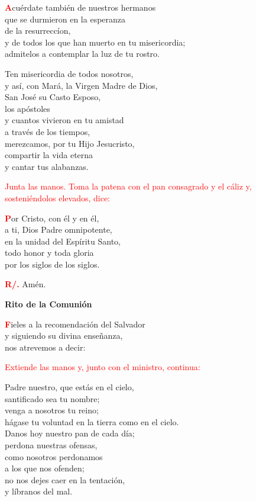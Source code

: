 \documentclass[12pt, letterpaper]{report}
\begin{document}
\lettrine[lines=1]{\bfseries \textcolor{red}{A}}{}\Large cu\'erdate tambi\'en de nuestros hermanos\\
que se durmieron en la esperanza\\
de la resurrecc\'ion,\\
y de todos los que han muerto en tu misericordia;\\
admitelos a contemplar la luz de tu rostro.

\noindent
Ten misericordia de todos nosotros,\\
y as\'i, con Mar\'a, la Virgen Madre de Dios,\\
San Jos\'e su Casto Esposo, \\
los ap\'ostoles\\
y cuantos vivieron en tu amistad\\
a trav\'es de los tiempos,\\
merezcamos, por tu Hijo Jesucristo,\\
compartir la vida eterna\\
y cantar tus alabanzas. 

\large{\textcolor{red}{Junta las manos. Toma la patena con el pan consagrado y el c\'aliz y, sosteni\'endolos elevados, dice:}}

\lettrine[lines=1]{\bfseries \textcolor{red}{P}}{}\Large or Cristo, con \'el y en \'el,\\
a ti, Dios Padre omnipotente,\\
en la unidad del Esp\'iritu Santo,\\
todo honor y toda gloria\\
por los siglos de los siglos.

\Large \hspace{-0.9cm} {\bfseries \textcolor{red}{R/.}} \hspace{0.5cm} Am\'en.

\newpage

\begin{center}
\Huge {\bfseries Rito de la Comuni\'on}
\end{center}

\lettrine[lines=1]{\bfseries \textcolor{red}{F}}{}\Large ieles a la recomendaci\'on del Salvador\\
y siguiendo su divina ense\~nanza,\\
nos atrevemos a decir:

\large{\textcolor{red}{Extiende las manos y, junto con el ministro, continua:}}

\noindent
\Large Padre nuestro, que est\'as en el cielo,\\
santificado sea tu nombre;\\
venga a nosotros tu reino;\\
h\'agase tu voluntad en la tierra como en el cielo.\\
Danos hoy nuestro pan de cada d\'ia;\\
perdona nuestras ofensas,\\
como nosotros perdonamos\\
a los que nos ofenden;\\
no nos dejes caer en la tentaci\'on,\\
y l\'ibranos del mal.
\end{document}

